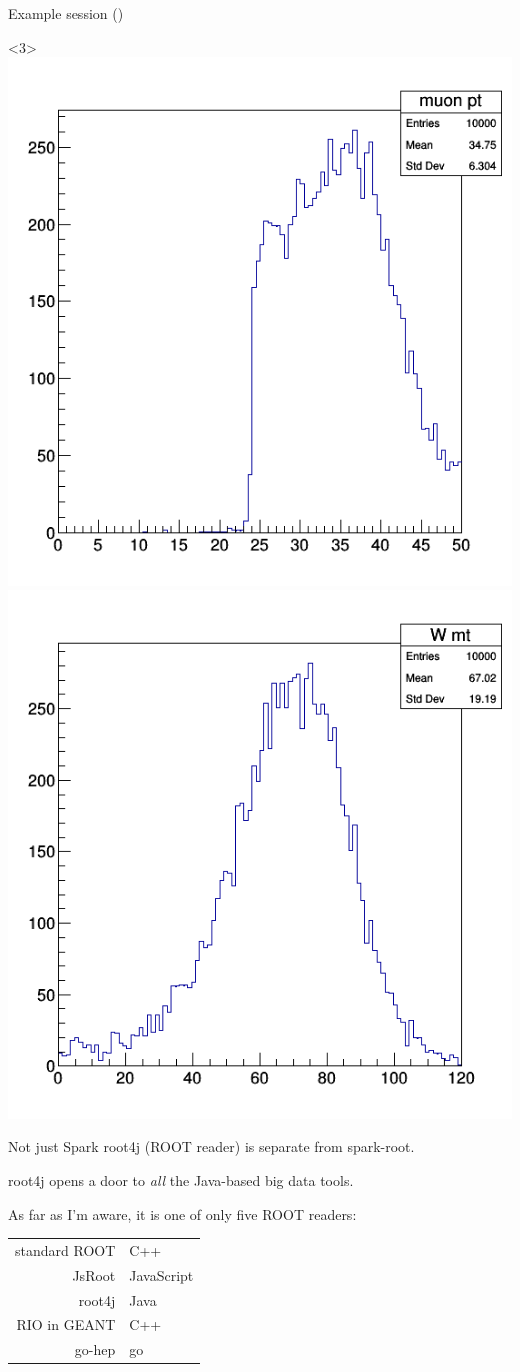 \documentclass{beamer}
\begin{document}
\begin{frame}[fragile]{Example session ()}
\vspace{-3.1 cm}
\begin{uncoverenv}<3>
\mbox{ } \hfill \includegraphics[width=3 cm]{muonpt.png}\includegraphics[width=3 cm]{wmt.png}
\end{uncoverenv}
\end{frame}

\begin{frame}{Not just Spark}
\vspace{0.5 cm}
root4j (ROOT reader) is separate from spark-root.

\vfill
root4j opens a door to {\it all} the Java-based big data tools.

\vfill
As far as I'm aware, it is one of only five ROOT readers:
\begin{center}
\renewcommand{\arraystretch}{1.2}
\begin{tabular}{r | l}
standard ROOT & C++ \\
JsRoot        & JavaScript\hspace{0.75 cm} \\
root4j        & Java \\
RIO in GEANT  & C++ \\
go-hep        & go
\end{tabular}
\end{center}
\end{frame}
\end{document}
